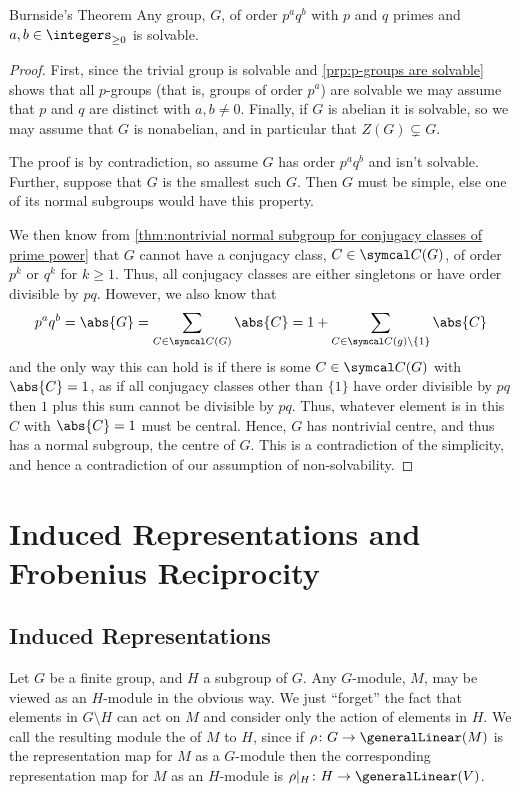 \begin{thm}{Burnside's Theorem}{}
    Any group, \(G\), of order \(p^aq^b\) with \(p\) and \(q\) primes and \(a, b \in \integers_{\ge 0}\) is solvable.
    \begin{proof}
        First, since the trivial group is solvable and \cref{prp:p-groups are solvable} shows that all \(p\)-groups (that is, groups of order \(p^a\)) are solvable we may assume that \(p\) and \(q\) are distinct with \(a, b \ne 0\).
        Finally, if \(G\) is abelian it is solvable, so we may assume that \(G\) is nonabelian, and in particular that \(Z(G) \subsetneq G\).
        
        The proof is by contradiction, so assume \(G\) has order \(p^aq^b\) and isn't solvable.
        Further, suppose that \(G\) is the smallest such \(G\).
        Then \(G\) must be simple, else one of its normal subgroups would have this property.
        
        We then know from \cref{thm:nontrivial normal subgroup for conjugacy classes of prime power} that \(G\) cannot have a conjugacy class, \(C \in \conjugacyClasses(G)\), of order \(p^k\) or \(q^k\) for \(k \ge 1\).
        Thus, all conjugacy classes are either singletons or have order divisible by \(pq\).
        However, we also know that
        \begin{equation}
            p^a q^b = \abs{G} = \sum_{C \in \conjugacyClasses(G)} \abs{C} = 1 + \sum_{C \in \conjugacyClasses(g) \setminus \{1\}} \abs{C}
        \end{equation}
        and the only way this can hold is if there is some \(C \in \conjugacyClasses(G)\) with \(\abs{C} = 1\), as if all conjugacy classes other than \(\{1\}\) have order divisible by \(pq\) then \(1\) plus this sum cannot be divisible by \(pq\).
        Thus, whatever element is in this \(C\) with \(\abs{C} = 1\) must be central.
        Hence, \(G\) has nontrivial centre, and thus has a normal subgroup, the centre of \(G\).
        This is a contradiction of the simplicity, and hence a contradiction of our assumption of non-solvability.
    \end{proof}
\end{thm}

\chapter[Induced Reps and Frobenius Reciprocity]{Induced Representations and Frobenius Reciprocity}
\section{Induced Representations}
Let \(G\) be a finite group, and \(H\) a subgroup of \(G\).
Any \(G\)-module, \(M\), may be viewed as an \(H\)-module in the obvious way.
We just \enquote{forget} the fact that elements in \(G \setminus H\) can act on \(M\) and consider only the action of elements in \(H\).
We call the resulting module the  of \(M\) to \(H\), since if \(\rho \colon G \to \generalLinear(M)\) is the representation map for \(M\) as a \(G\)-module then the corresponding representation map for \(M\) as an \(H\)-module is \(\rho|_H \colon H \to \generalLinear(V)\).

